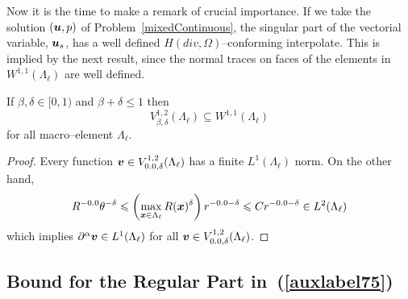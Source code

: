 Now it is the time to make a remark of crucial importance. If we take the
solution $(\boldsymbol{u}, p)$ of Problem~\ref{mixedContinuous},
the singular part of the vectorial variable, $\boldsymbol{u}_s$, has a well defined $H(div, \Omega)$--conforming interpolate.
This is implied by the next result, since the normal traces on faces
of the elements in $W^{1,1}(\Lambda_\ell)$ are well defined.
\begin{lemma}\label{well_defined_dofs}
If $\beta,\delta\in[0,1)$ and $\beta + \delta\leqslant 1$ then 
\[
  V^{1,2}_{\beta,\delta}(\Lambda_\ell) \subseteq W^{1,1}(\Lambda_\ell)
\]
for all macro--element $\Lambda_{\ell}$.
\end{lemma}
\begin{proof}
Every function ${\bv}\in V^{1,2}_{\beta,\delta}(\Lambda_\ell)$ has a finite
$L^1(\Lambda_\ell)$ norm. On the other hand,
\[
  R^{-\beta}\theta^{-\delta}\leqslant\left(\max_{\bx
  \in\Lambda_\ell}R(\bx)^\delta\right)
  r^{-\beta-\delta}
  \leqslant C r^{-\beta-\delta}\in L^2(\Lambda_\ell)
\]
which implies $\partial^\alpha{\boldsymbol{v}}\in L^1(\Lambda_\ell)$ for all
$\bv\in V^{1,2}_{\beta,\delta}(\Lambda_\ell)$.
\end{proof}
\subsection{Bound for the Regular Part in~(\ref{auxlabel75})} %
\label{sub:bound_for_the_regular_part}

